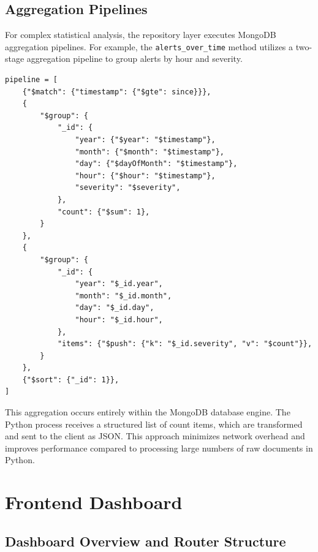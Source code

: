 \documentclass[12pt,a4paper]{report}
\begin{document}
\subsection{Aggregation Pipelines}

For complex statistical analysis, the repository layer executes MongoDB aggregation pipelines. For example, the \texttt{alerts\_over\_time} method utilizes a two-stage aggregation pipeline to group alerts by hour and severity.

\begin{lstlisting}[style=pythonstyle, caption={Aggregation pipeline grouping alerts by hour and severity}]
pipeline = [
    {"$match": {"timestamp": {"$gte": since}}},
    {
        "$group": {
            "_id": {
                "year": {"$year": "$timestamp"},
                "month": {"$month": "$timestamp"},
                "day": {"$dayOfMonth": "$timestamp"},
                "hour": {"$hour": "$timestamp"},
                "severity": "$severity",
            },
            "count": {"$sum": 1},
        }
    },
    {
        "$group": {
            "_id": {
                "year": "$_id.year",
                "month": "$_id.month",
                "day": "$_id.day",
                "hour": "$_id.hour",
            },
            "items": {"$push": {"k": "$_id.severity", "v": "$count"}},
        }
    },
    {"$sort": {"_id": 1}},
]
\end{lstlisting}

This aggregation occurs entirely within the MongoDB database engine. The Python process receives a structured list of count items, which are transformed and sent to the client as JSON. This approach minimizes network overhead and improves performance compared to processing large numbers of raw documents in Python.

\section{Frontend Dashboard}

\subsection{Dashboard Overview and Router Structure}
\end{document}
